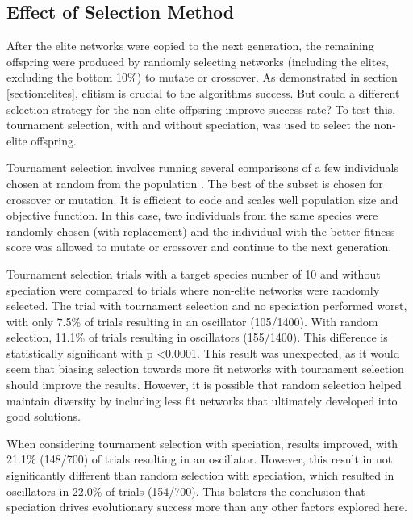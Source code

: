 \documentclass[12pt]{report}
\begin{document}
\subsection{Effect of Selection Method}
After the elite networks were copied to the next generation, the remaining offspring were produced by randomly selecting networks (including the elites, excluding the bottom 10\%) to mutate or crossover. As demonstrated in section \ref{section:elites}, elitism is crucial to the algorithms success. But could a different selection strategy for the non-elite offpsring improve success rate? To test this, tournament selection, with and without speciation, was used to select the non-elite offspring.

Tournament selection involves running several comparisons of a few individuals chosen at random from the population \cite{tournamentselect,  Miller1995}. The best of the subset is chosen for crossover or mutation. It is efficient to code and scales well population size and objective function. In this case, two individuals from the same species were randomly chosen (with replacement) and the individual with the better fitness score was allowed to mutate or crossover and continue to the next generation.

Tournament selection trials with a target species number of 10 and without speciation were compared to trials where non-elite networks were randomly selected. The trial with tournament selection and no speciation performed worst, with only 7.5\% of trials resulting in an oscillator (105/1400). With random selection, 11.1\% of trials resulting in oscillators (155/1400). This difference is statistically significant with p \textless 0.0001. This result was unexpected, as it would seem that biasing selection towards more fit networks with tournament selection should improve the results. However, it is possible that random selection helped maintain diversity by including less fit networks that ultimately developed into good solutions.

When considering tournament selection with speciation, results improved, with 21.1\% (148/700) of trials resulting in an oscillator. However, this result in not significantly different than random selection with speciation, which resulted in oscillators in 22.0\% of trials (154/700). This bolsters the conclusion that speciation drives evolutionary success more than any other factors explored here.
\end{document}
